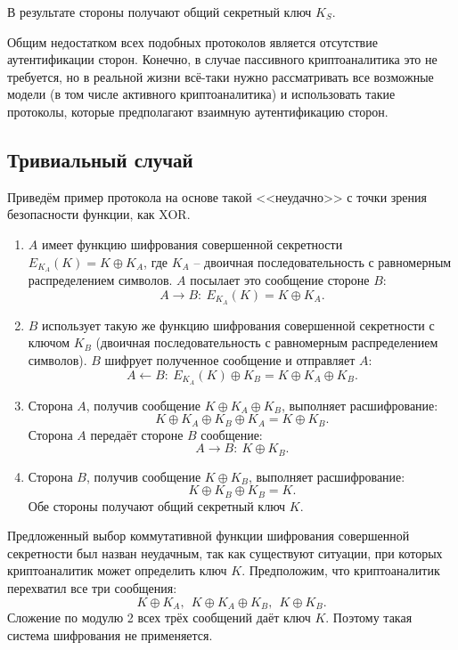 В результате стороны получают общий секретный ключ $K_S$.

Общим недостатком всех подобных протоколов является отсутствие аутентификации сторон. Конечно, в случае пассивного криптоаналитика это не требуется, но в реальной жизни всё-таки нужно рассматривать все возможные модели (в том числе активного криптоаналитика) и использовать такие протоколы, которые предполагают взаимную аутентификацию сторон.

\subsection[Тривиальный случай]{Тривиальный случай}

Приведём пример протокола на основе такой <<неудачно>> с точки зрения безопасности функции, как XOR.

\begin{enumerate}
    \item $A$ имеет функцию шифрования совершенной секретности $E_{K_A}(K) = K \oplus K_A$, где $K_A$ -- двоичная последовательность с равномерным распределением символов. $A$ посылает это сообщение стороне $B$:
            \[ A \rightarrow B: ~ E_{K_A}(K) = K \oplus K_A. \]
    \item $B$ использует такую же функцию шифрования совершенной секретности с ключом $K_B$ (двоичная последовательность с равномерным распределением символов). $B$ шифрует полученное сообщение и отправляет $A$:
            \[ A \leftarrow B: ~ E_{K_A}(K) \oplus K_B = K \oplus K_A \oplus K_B. \]
    \item Сторона $A$, получив сообщение $K \oplus K_A \oplus K_B$, выполняет расшифрование:
            \[ K \oplus K_A \oplus K_B \oplus K_A = K \oplus K_B. \]
        Сторона $A$ передаёт стороне $B$ сообщение:
            \[ A \rightarrow B: ~ K \oplus K_B. \]
    \item Сторона $B$, получив сообщение $K \oplus K_B$, выполняет расшифрование:
            \[ K \oplus K_B \oplus K_B = K. \]
        Обе стороны получают общий секретный ключ $K$.
\end{enumerate}

Предложенный выбор коммутативной функции шифрования совершенной секретности был назван неудачным, так как существуют ситуации, при которых криптоаналитик может определить ключ $K$. Предположим, что криптоаналитик перехватил все три сообщения:
    \[ K \oplus K_A, ~~ K \oplus K_A \oplus K_B, ~~ K \oplus K_B. \]
Сложение по модулю 2 всех трёх сообщений даёт ключ $K$. Поэтому такая система шифрования не применяется.

